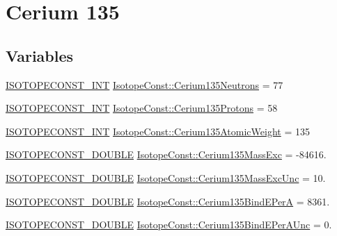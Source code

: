 \hypertarget{group___isotope_const-_cerium-_ce135}{}\section{Cerium 135}
\label{group___isotope_const-_cerium-_ce135}
\subsection*{Variables}
\begin{DoxyCompactItemize}
\item 
\mbox{\hyperlink{group___isotope_const-_macros_ga5f18360b3e99483a35c32d789e62621c}{I\+S\+O\+T\+O\+P\+E\+C\+O\+N\+S\+T\+\_\+\+I\+NT}} \mbox{\hyperlink{group___isotope_const-_cerium-_ce135_ga2c8fb14a4edd887070a9743c7f7f0d27}{Isotope\+Const\+::\+Cerium135\+Neutrons}} = 77
\item 
\mbox{\hyperlink{group___isotope_const-_macros_ga5f18360b3e99483a35c32d789e62621c}{I\+S\+O\+T\+O\+P\+E\+C\+O\+N\+S\+T\+\_\+\+I\+NT}} \mbox{\hyperlink{group___isotope_const-_cerium-_ce135_gab42e234374aeb291ce0ec2e48056d54c}{Isotope\+Const\+::\+Cerium135\+Protons}} = 58
\item 
\mbox{\hyperlink{group___isotope_const-_macros_ga5f18360b3e99483a35c32d789e62621c}{I\+S\+O\+T\+O\+P\+E\+C\+O\+N\+S\+T\+\_\+\+I\+NT}} \mbox{\hyperlink{group___isotope_const-_cerium-_ce135_ga0b0d83fc4412c1263e239d44aeb8a5da}{Isotope\+Const\+::\+Cerium135\+Atomic\+Weight}} = 135
\item 
\mbox{\hyperlink{group___isotope_const-_macros_ga8f45a7272ce02c0b4c65c44636ed719a}{I\+S\+O\+T\+O\+P\+E\+C\+O\+N\+S\+T\+\_\+\+D\+O\+U\+B\+LE}} \mbox{\hyperlink{group___isotope_const-_cerium-_ce135_ga4a0efef94dd665f8b21ac87247c189f5}{Isotope\+Const\+::\+Cerium135\+Mass\+Exc}} = -\/84616.
\item 
\mbox{\hyperlink{group___isotope_const-_macros_ga8f45a7272ce02c0b4c65c44636ed719a}{I\+S\+O\+T\+O\+P\+E\+C\+O\+N\+S\+T\+\_\+\+D\+O\+U\+B\+LE}} \mbox{\hyperlink{group___isotope_const-_cerium-_ce135_ga691cc80c26b220ffbfdde04d58199d3d}{Isotope\+Const\+::\+Cerium135\+Mass\+Exc\+Unc}} = 10.
\item 
\mbox{\hyperlink{group___isotope_const-_macros_ga8f45a7272ce02c0b4c65c44636ed719a}{I\+S\+O\+T\+O\+P\+E\+C\+O\+N\+S\+T\+\_\+\+D\+O\+U\+B\+LE}} \mbox{\hyperlink{group___isotope_const-_cerium-_ce135_ga8f1c2edc4d946494e7526a36c252abac}{Isotope\+Const\+::\+Cerium135\+Bind\+E\+PerA}} = 8361.
\item 
\mbox{\hyperlink{group___isotope_const-_macros_ga8f45a7272ce02c0b4c65c44636ed719a}{I\+S\+O\+T\+O\+P\+E\+C\+O\+N\+S\+T\+\_\+\+D\+O\+U\+B\+LE}} \mbox{\hyperlink{group___isotope_const-_cerium-_ce135_gafa0ad898bf80834c0dd4be2909e87455}{Isotope\+Const\+::\+Cerium135\+Bind\+E\+Per\+A\+Unc}} = 0.

\end{DoxyCompactItemize}
